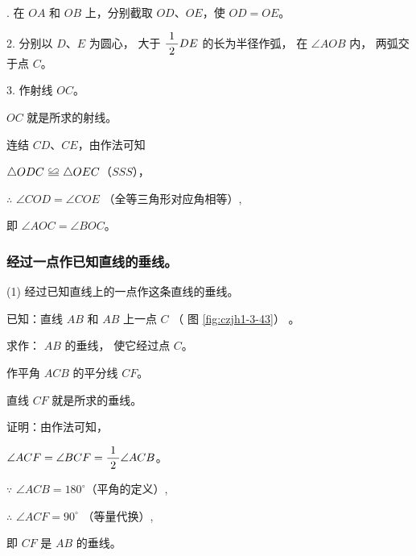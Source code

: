 \begin{enhancedline}
. 在 $OA$ 和 $OB$ 上，分别截取 $OD$、$OE$，使 $OD = OE$。

2. 分别以 $D$、$E$ 为圆心， 大于 $\dfrac{\; 1 \;}{2} DE$ 的长为半径作弧， 在 $\angle AOB$ 内， 两弧交于点 $C$。

\begin{wrapfigure}[6]{r}{6cm}
  \centering
  
  \caption{}\label{fig:czjh1-3-42}
\end{wrapfigure}

3. 作射线 $OC$。

$OC$ 就是所求的射线。

\zhengming 连结 $CD$、$CE$，由作法可知

\qquad $\triangle ODC \quandeng \triangle OEC$（$SSS$），

$\therefore$ \quad $\angle COD = \angle COE$ （全等三角形对应角相等）,

即 \quad $\angle AOC = \angle BOC$。


\subsubsection{经过一点作已知直线的垂线。}

(1) 经过已知直线上的一点作这条直线的垂线。

已知：直线 $AB$ 和 $AB$ 上一点 $C$ （ 图 \ref{fig:czjh1-3-43}） 。

求作： $AB$ 的垂线， 使它经过点 $C$。

\zuofa 作平角 $ACB$ 的平分线 $CF$。

直线 $CF$ 就是所求的垂线。

证明：由作法可知，

\qquad $\angle ACF = \angle BCF = \dfrac{\; 1 \;}{2} \angle ACB$。

$\because$ \quad $\angle ACB = 180^\circ$（平角的定义）,

$\therefore$ \quad $\angle ACF = 90^\circ$ （等量代换）,

即 \quad $CF$ 是 $AB$ 的垂线。

\begin{figure}[htbp]
  \centering
  \begin{minipage}[b]{7cm}
      \centering
      
      \caption{}\label{fig:czjh1-3-43}
  \end{minipage}
  \qquad
  \begin{minipage}[b]{7cm}
      \centering
      
      \caption{}\label{fig:czjh1-3-44}
  \end{minipage}
\end{figure}


\end{enhancedline}
